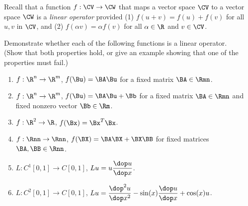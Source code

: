 Recall that a function $f: \CV \to \CW$ that maps a vector space $\CV$ to
a vector space $\CW$ is a \emph{linear operator}
provided (1) $f(u+v) = f(u)+f(v)$ for all $u, v$ in $\CV$,
and (2) $f(\alpha v) = \alpha f(v)$ for all $\alpha\in \R$ and $v\in\CV$.

Demonstrate whether each of the following functions is a linear operator.\\
(Show that both properties hold, or give an example showing that one 
of the properties must fail.)

\begin{enumerate}
\item $f:\R^n\to \R^m$, $f(\Bu) = \BA \Bu$ for a fixed matrix $\BA\in\Rmn$.
\item $f:\R^n\to \R^m$, $f(\Bu) = \BA \Bu + \Bb$ for a fixed matrix $\BA\in\Rmn$ 
       and fixed nonzero vector $\Bb\in\Rm$.
\item $f:\R^2 \to \R$,  $f(\Bx) = \Bx^T \Bx$.
\item $f:\Rnn\to \Rnn$, $f(\BX) = \BA\BX + \BX\BB$ for fixed matrices $\BA, \BB\in\Rnn$.
\item $L: C^1[0,1] \to C[0,1]$, ${\displaystyle{ Lu = u {\dop u \over \dop x}}}$.
\item $L: C^2[0,1] \to C[0,1]$, ${\displaystyle{ Lu = {\dop^2 u \over \dop x^2} - \sin(x) {\dop u \over \dop x} + \cos(x) u}}$.

\end{enumerate}


